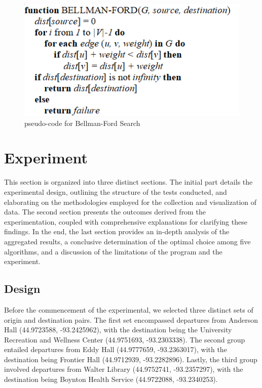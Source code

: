 \documentclass[12pt]{article}
\begin{document}
\begin{figure}[H]
\centering
\includegraphics[scale=0.75]{images/BF.png}
\caption{pseudo-code for Bellman-Ford Search}
\label{fig: bellman-ford}
\end{figure}


\section{Experiment}

This section is organized into three distinct sections. The initial part details the experimental design, outlining the structure of the tests conducted, and elaborating on the methodologies employed for the collection and visualization of data. The second section presents the outcomes derived from the experimentation, coupled with comprehensive explanations for clarifying these findings. In the end, the last section provides an in-depth analysis of the aggregated results, a conclusive determination of the optimal choice among five algorithms, and a discussion of the limitations of the program and the experiment.

\subsection{Design}

Before the commencement of the experimental, we selected three distinct sets of origin and destination pairs. The first set encompassed departures from Anderson Hall (44.9723588, -93.2425962), with the destination being the University Recreation and Wellness Center (44.9751693, -93.2303338). The second group entailed departures from Eddy Hall (44.9777659, -93.2363017), with the destination being Frontier Hall (44.9712939, -93.2282896). Lastly, the third group involved departures from Walter Library (44.9752741, -93.2357297), with the destination being Boynton Health Service (44.9722088, -93.2340253).
\end{document}
